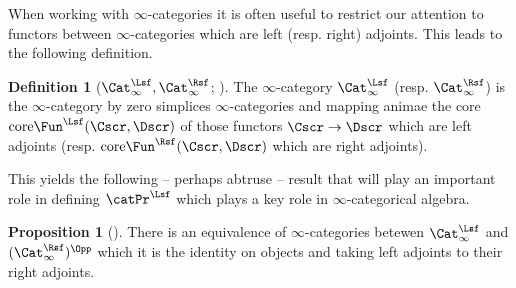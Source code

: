 \documentclass{amsart}
\theoremstyle{definition}
\newtheorem{proposition}[theorem]{Proposition}
\newtheorem{definition}[theorem]{Definition}
\numberwithin{equation}{section}
\begin{document}
When working with $\infty$-categories it is often useful to restrict our attention to functors between $\infty$-categories which are left (resp. right) adjoints. This leads to the following definition.
\begin{definition}[$\Cat_{\infty}^{\Lsf},\Cat_{\infty}^{\Rsf}$; {\cite[Corr. 6.8]{Wagner}}]\label{def: category with left and right adjoints}
  The $\infty$-category $\Cat_{\infty}^{\Lsf}$ (resp. $\Cat_{\infty}^{\Rsf}$) is the $\infty$-category by zero simplices $\infty$-categories and mapping animae the core $\mathrm{core}\Fun^{\Lsf}(\Cscr,\Dscr)$ of those functors $\Cscr\to\Dscr$ which are left adjoints (resp. $\mathrm{core}\Fun^{\Rsf}(\Cscr,\Dscr)$ which are right adjoints).
\end{definition}
This yields the following -- perhaps abtruse -- result that will play an important role in defining $\catPr^{\Lsf}$ which plays a key role in $\infty$-categorical algebra.
\begin{proposition}[{\cite[Corr. 6.8 (b)]{Wagner}}]\label{prop: reflections CatL to CatR}
  There is an equivalence of $\infty$-categories betewen $\Cat_{\infty}^{\Lsf}$ and $(\Cat_{\infty}^{\Rsf})^{\Opp}$ which it is the identity on objects and taking left adjoints to their right adjoints.
\end{proposition}
\end{document}
